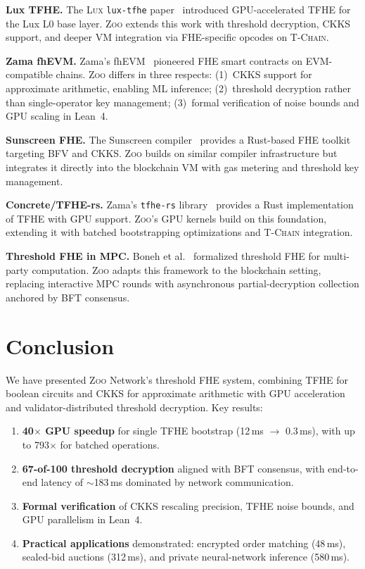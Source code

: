 \documentclass[11pt,letterpaper]{article}
\theoremstyle{definition}
\theoremstyle{remark}
\newcommand{\Zoo}{\textsc{Zoo}}
\newcommand{\Lux}{\textsc{Lux}}
\newcommand{\TChain}{\textsc{T-Chain}}
\newcommand{\TFHE}{\textsc{TFHE}}
\newcommand{\CKKS}{\textsc{CKKS}}
\begin{document}
\textbf{Lux TFHE.} The \Lux{} \texttt{lux-tfhe} paper~\cite{lux-tfhe} introduced GPU-accelerated TFHE for the Lux L0 base layer. \Zoo{} extends this work with threshold decryption, \CKKS{} support, and deeper VM integration via FHE-specific opcodes on \TChain{}.

\textbf{Zama fhEVM.} Zama's fhEVM~\cite{zama-fhevm} pioneered FHE smart contracts on EVM-compatible chains. \Zoo{} differs in three respects: (1)~\CKKS{} support for approximate arithmetic, enabling ML inference; (2)~threshold decryption rather than single-operator key management; (3)~formal verification of noise bounds and GPU scaling in Lean~4.

\textbf{Sunscreen FHE.} The Sunscreen compiler~\cite{sunscreen2023} provides a Rust-based FHE toolkit targeting BFV and CKKS. \Zoo{} builds on similar compiler infrastructure but integrates it directly into the blockchain VM with gas metering and threshold key management.

\textbf{Concrete/TFHE-rs.} Zama's \texttt{tfhe-rs} library~\cite{zama-tfhers} provides a Rust implementation of TFHE with GPU support. \Zoo{}'s GPU kernels build on this foundation, extending it with batched bootstrapping optimizations and \TChain{} integration.

\textbf{Threshold FHE in MPC.} Boneh et al.~\cite{boneh2018threshold} formalized threshold FHE for multi-party computation. \Zoo{} adapts this framework to the blockchain setting, replacing interactive MPC rounds with asynchronous partial-decryption collection anchored by BFT consensus.

\section{Conclusion}
\label{sec:conclusion}

We have presented \Zoo{} Network's threshold FHE system, combining \TFHE{} for boolean circuits and \CKKS{} for approximate arithmetic with GPU acceleration and validator-distributed threshold decryption. Key results:

\begin{enumerate}
  \item \textbf{40$\times$ GPU speedup} for single \TFHE{} bootstrap (12\,ms $\to$ 0.3\,ms), with up to 793$\times$ for batched operations.
  \item \textbf{67-of-100 threshold decryption} aligned with BFT consensus, with end-to-end latency of $\sim$183\,ms dominated by network communication.
  \item \textbf{Formal verification} of \CKKS{} rescaling precision, \TFHE{} noise bounds, and GPU parallelism in Lean~4.
  \item \textbf{Practical applications} demonstrated: encrypted order matching (48\,ms), sealed-bid auctions (312\,ms), and private neural-network inference (580\,ms).
\end{enumerate}
\end{document}
